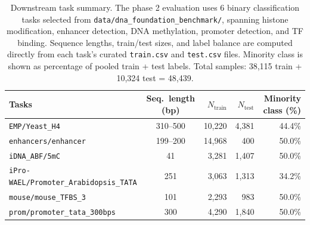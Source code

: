 \begin{table}[t]
  \centering
  \caption{Downstream task summary. The phase 2 evaluation uses 6 binary classification tasks selected from \texttt{data/dna\_foundation\_benchmark/}, spanning histone modification, enhancer detection, DNA methylation, promoter detection, and TF binding. Sequence lengths, train/test sizes, and label balance are computed directly from each task's curated \texttt{train.csv} and \texttt{test.csv} files. Minority class is shown as percentage of pooled train + test labels. Total samples: 38,115 train + 10,324 test = 48,439.}
  \label{tab:downstream_tasks}
  \small
  \begin{tabular}{l c r r r}
    \toprule
    Tasks & Seq.\ length (bp) & $N_{\mathrm{train}}$ & $N_{\mathrm{test}}$ & Minority class (\%) \\
    \midrule
    \texttt{EMP/Yeast\_H4} & 310--500 & 10,220 & 4,381 & 44.4\% \\
    \texttt{enhancers/enhancer} & 199--200 & 14,968 & 400 & 50.0\% \\
    \texttt{iDNA\_ABF/5mC} & 41 & 3,281 & 1,407 & 50.0\% \\
    \texttt{iPro-WAEL/Promoter\_Arabidopsis\_TATA} & 251 & 3,063 & 1,313 & 34.2\% \\
    \texttt{mouse/mouse\_TFBS\_3} & 101 & 2,293 & 983 & 50.0\% \\
    \texttt{prom/promoter\_tata\_300bps} & 300 & 4,290 & 1,840 & 50.0\% \\
    \bottomrule
  \end{tabular}
\end{table}

